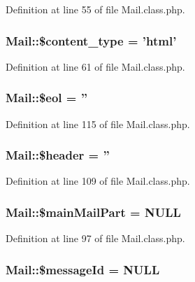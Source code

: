 Definition at line 55 of file Mail.\+class.\+php.

\hypertarget{classMail_ac933733b17efbb4978a46e557d32c440}{
\subsubsection[{\$content\+\_\+type}]{\setlength{\rightskip}{0pt plus 5cm}Mail\+::\$content\+\_\+type = 'html'}}\label{classMail_ac933733b17efbb4978a46e557d32c440}


Definition at line 61 of file Mail.\+class.\+php.

\hypertarget{classMail_acaebf19cba0b8be83989e241c96f9eb7}{
\subsubsection[{\$eol}]{\setlength{\rightskip}{0pt plus 5cm}Mail\+::\$eol = ''}}\label{classMail_acaebf19cba0b8be83989e241c96f9eb7}


Definition at line 115 of file Mail.\+class.\+php.

\hypertarget{classMail_ace98431d0944d23544743094b443d506}{
\subsubsection[{\$header}]{\setlength{\rightskip}{0pt plus 5cm}Mail\+::\$header = ''}}\label{classMail_ace98431d0944d23544743094b443d506}


Definition at line 109 of file Mail.\+class.\+php.

\hypertarget{classMail_ad58544ae1c34119ec852e3c22b855624}{
\subsubsection[{\$main\+Mail\+Part}]{\setlength{\rightskip}{0pt plus 5cm}Mail\+::\$main\+Mail\+Part = N\+U\+L\+L}}\label{classMail_ad58544ae1c34119ec852e3c22b855624}


Definition at line 97 of file Mail.\+class.\+php.

\hypertarget{classMail_a48caf58883e736f50ab87a03147c584a}{
\subsubsection[{\$message\+Id}]{\setlength{\rightskip}{0pt plus 5cm}Mail\+::\$message\+Id = N\+U\+L\+L}}\label{classMail_a48caf58883e736f50ab87a03147c584a}


